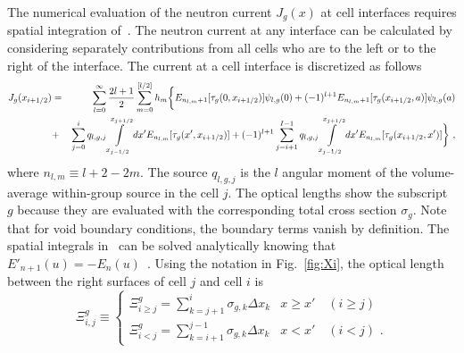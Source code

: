 The numerical evaluation of the neutron current $J_g(x)$ at cell interfaces requires spatial integration of~. The neutron current at any interface can be calculated by considering separately contributions from all cells who are to the left or to the right of the interface. The current at a cell interface is discretized as follows
\begin{eqnarray}\label{eq:tot-J-disc}
J_g(x_{i+1/2}) &=& \sum\limits_{l=0}^\infty  \frac{2l+1}{2}
\sum\limits_{m=0}^{[l/2]}  h_m
\bigg\{
E_{n_{l,m}+1}[\tau_g(0,x_{i+1/2})] \psi_{l,g}(0) 
+(-1)^{l+1} E_{n_{l,m}+1}[\tau_g(x_{i+1/2},a)]\psi_{l,g}(a)  \nonumber \\
&+&
\sum\limits_{j=0}^i q_{l,g,j}\int\limits_{x_{j-1/2}}^{x_{j+1/2}} dx'
E_{n_{l,m}}[\tau_g(x',x_{i+1/2})]
+(-1)^{l+1} 
\sum\limits_{j=i+1}^{I-1} q_{l,g,j}\int\limits_{x_{j-1/2}}^{x_{j+1/2}} dx'
E_{n_{l,m}}[\tau_g(x_{i+1/2},x')]
\bigg\}	\,\, , 
\end{eqnarray}
where $n_{l,m}\equiv l+2-2m$. The source $q_{l,g,j}$ is the $l$ angular moment of the volume-average within-group source in the cell $j$. The optical lengths show the subscript $g$ because they are evaluated with the corresponding total cross section $\sigma_g$. Note that for void boundary conditions, the boundary terms vanish by definition. The spatial integrals in~ can be solved analytically knowing that $E'_{n+1}(u)=-E_n(u)$~\cite{Gradshteyn-2007}. Using the notation in Fig.~\ref{fig:Xi}, the optical length between the right surfaces of cell $j$ and cell $i$ is
\begin{equation}\label{eq:psi_w_left_right}
\Xi^g_{i,j} \equiv \begin{cases}
\Xi^g_{i\geqslant j} = \sum\limits_{k=j+1}^i \sigma_{g,k}\Delta x_k 
& x\geqslant x' \quad (i\geqslant j) \\
\Xi^g_{i<j} = \sum\limits_{k=i+1}^{j-1} \sigma_{g,k}\Delta x_k & x<x' \quad (i<j)\,\, .
\end{cases} 
\end{equation} 

